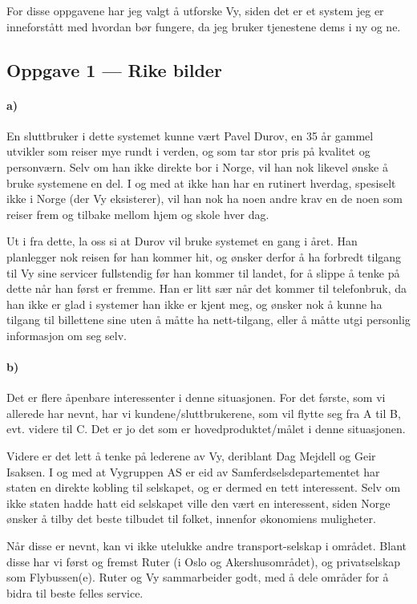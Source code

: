 \documentclass{../../myassignment}
\begin{document}
	For disse oppgavene har jeg valgt å utforske Vy, siden det er et system jeg er inneforstått med hvordan bør fungere, da jeg bruker tjenestene dems i ny og ne. 

	\subsection*{Oppgave 1 --- Rike bilder}
	\paragraph*{a)}
	\begin{answer}
		En sluttbruker i dette systemet kunne vært Pavel Durov, en 35 år gammel utvikler som reiser mye rundt i verden, og som tar stor pris på kvalitet og personværn. Selv om han ikke direkte bor i Norge, vil han nok likevel ønske å bruke systemene en del. I og med at ikke han har en rutinert hverdag, spesiselt ikke i Norge (der Vy eksisterer), vil han nok ha noen andre krav en de noen som reiser frem og tilbake mellom hjem og skole hver dag. 

		Ut i fra dette, la oss si at Durov vil bruke systemet en gang i året. Han planlegger nok reisen før han kommer hit, og ønsker derfor å ha forbredt tilgang til Vy sine servicer fullstendig før han kommer til landet, for å slippe å tenke på dette når han først er fremme. Han er litt sær når det kommer til telefonbruk, da han ikke er glad i systemer han ikke er kjent meg, og ønsker nok å kunne ha tilgang til billettene sine uten å måtte ha nett-tilgang, eller å måtte utgi personlig informasjon om seg selv. 

	\end{answer}

	\paragraph*{b)}
	\begin{answer}
		Det er flere åpenbare interessenter i denne situasjonen. For det første, som vi allerede har nevnt, har vi kundene/sluttbrukerene, som vil flytte seg fra A til B, evt. videre til C. Det er jo det som er hovedproduktet/målet i denne situasjonen. 

		Videre er det lett å tenke på lederene av Vy, deriblant Dag Mejdell og Geir Isaksen. I og med at Vygruppen AS er eid av Samferdselsdepartementet har staten en direkte kobling til selskapet, og er dermed en tett interessent. Selv om ikke staten hadde hatt eid selskapet ville den vært en interessent, siden Norge ønsker å tilby det beste tilbudet til folket, innenfor økonomiens muligheter. 

		Når disse er nevnt, kan vi ikke utelukke andre transport-selskap i området. Blant disse har vi først og fremst Ruter (i Oslo og Akershusområdet), og privatselskap som Flybussen(e). Ruter og Vy sammarbeider godt, med å dele områder for å bidra til beste felles service.

	\end{answer}
\end{document}
